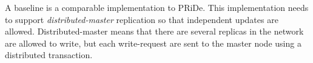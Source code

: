 A baseline is a comparable implementation to PRiDe. This implementation needs to support \emph{distributed-master} replication so that independent updates are allowed. Distributed-master means that there are several replicas in the network are allowed to write, but each write-request are sent to the master node using a distributed transaction. 









	

